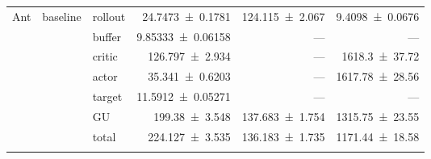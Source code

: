 {\begin{longtable}{@{}lllrrr@{}}
    Ant & baseline & rollout & \num{24.7473+-0.1781} & \num{124.115+-2.067} & \num{9.4098+-0.0676} \\
     &  & buffer & \num{9.85333+-0.06158} & --- & --- \\
     &  & critic & \num{126.797+-2.934} & --- & \num{1618.3+-37.72} \\
     &  & actor & \num{35.341+-0.6203} & --- & \num{1617.78+-28.56} \\
     &  & target & \num{11.5912+-0.05271} & --- & --- \\
     &  & GU & \num{199.38+-3.548} & \num{137.683+-1.754} & \num{1315.75+-23.55} \\
     &  & total & \num{224.127+-3.535} & \num{136.183+-1.735} & \num{1171.44+-18.58} \\
    \addlinespace[2pt]
  \end{longtable}
}

